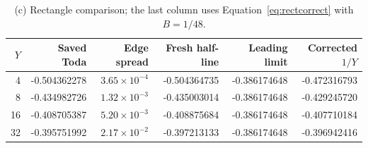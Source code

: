 \documentclass[11pt,a4paper]{article}
\begin{document}
\begingroup\small\setlength{\tabcolsep}{4pt}
\begin{longtable}{@{}rrrrrr@{}}
\caption{(c) Rectangle comparison; the last column uses Equation~\eqref{eq:rectcorrect} with $B=1/48$.}\\
\toprule $Y$ & Saved Toda & Edge spread & Fresh half-line & Leading limit & Corrected $1/Y$\\\midrule\endhead
4 & -0.504362278 & $3.65\times10^{-4}$ & -0.504364735 & -0.386174648 & -0.472316793\\
8 & -0.434982726 & $1.32\times10^{-3}$ & -0.435003014 & -0.386174648 & -0.429245720\\
16 & -0.408705387 & $5.20\times10^{-3}$ & -0.408875684 & -0.386174648 & -0.407710184\\
32 & -0.395751992 & $2.17\times10^{-2}$ & -0.397213133 & -0.386174648 & -0.396942416\\
\bottomrule\end{longtable}\endgroup
\end{document}
